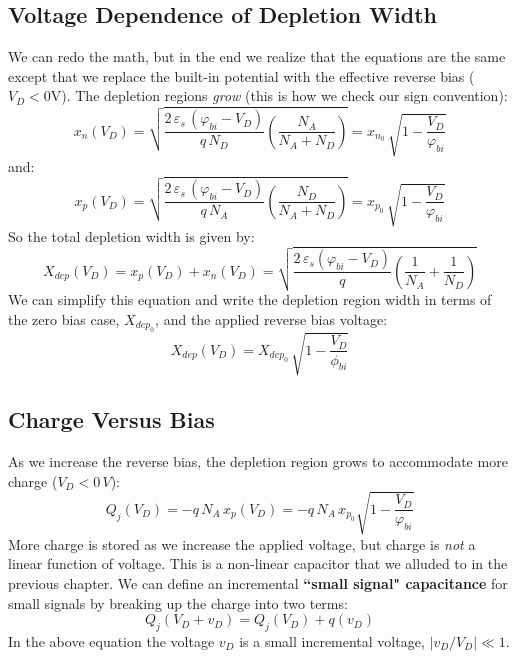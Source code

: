 \subsection{Voltage Dependence of Depletion Width}
We can redo the math, but in the end we realize that the equations are the same except that we replace the built-in potential with the effective reverse bias ($V_D < 0$V).  The depletion regions \emph{grow} (this is how we check our sign convention):
    \begin{equation} 
        x_n(V_D) = \sqrt{ \frac{2\,\varepsilon_s\,(\varphi_{bi} - V_D)}{q\,N_D} \left( \frac{N_A}{N_A + N_D} \right) } = 
        x_{n_0}\,\sqrt{ 1 - \frac{V_D}{\varphi_{bi}} } 
    \end{equation}
and:
    \begin{equation} 
        x_p(V_D) = \sqrt{ \frac{2\,\varepsilon_s\,(\varphi_{bi} - V_D)}{q\,N_A} \left( \frac{N_D}{N_A + N_D} \right) } = 
        x_{p_0}\,\sqrt{ 1 - \frac{V_D}{\varphi_{bi}} } 
    \end{equation}
So the total depletion width is given by:
    \begin{equation}
        X_{dep}(V_D) = x_p(V_D) + x_n(V_D) = 
        \sqrt{ \frac{2\,\varepsilon_s(\varphi_{bi} - V_D)}{q} \left( \frac{1}{N_A} + \frac{1}{N_D} \right) } 
    \end{equation}
We can simplify this equation and write the depletion region width in terms of the zero bias case, $X_{{dep}_0}$, and the applied reverse bias voltage:
    \begin{equation} 
        X_{dep}(V_D) = X_{{dep}_0}\,\sqrt{ 1 - \frac{V_D}{\phi_{bi}}} 
    \end{equation}
\subsection{Charge Versus Bias}
As we increase the reverse bias, the depletion region grows to accommodate more charge ($V_D < 0\,V$):
    \begin{equation} 
        Q_j(V_D) =  -q\,N_A\,x_p(V_D) = -q\,N_A\,x_{p_0}\sqrt{ 1 - \frac{V_D}{\varphi_{bi}} }
    \end{equation}
More charge is stored as we increase the applied voltage, but charge is \textit{not} a linear function of voltage.  This is a non-linear capacitor that we alluded to in the previous chapter.  We can define an incremental \textbf{``small signal" capacitance} for small signals by breaking up the charge into two terms:
    \begin{equation} 
        Q_j(V_D + v_D) = Q_j(V_D) + q(v_D) 
    \end{equation}
In the above equation the voltage $v_D$ is a small incremental voltage, $|v_D/V_D| \ll 1$.
